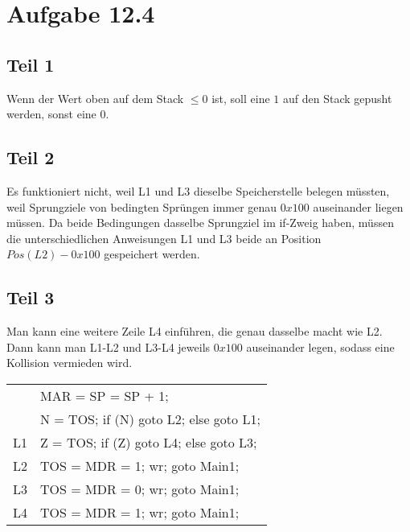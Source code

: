 \documentclass[10pt,a4paper]{article}
\begin{document}
\section*{Aufgabe 12.4}

\subsection*{Teil 1}

Wenn der Wert oben auf dem Stack $\le 0$ ist, soll eine $1$ auf den Stack gepusht werden, sonst eine $0$.

\subsection*{Teil 2}

Es funktioniert nicht, weil L1 und L3 dieselbe Speicherstelle belegen müssten, weil Sprungziele von bedingten Sprüngen immer genau $0x100$ auseinander liegen müssen.
Da beide Bedingungen dasselbe Sprungziel im if-Zweig haben, müssen die unterschiedlichen Anweisungen L1 und L3 beide an Position $Pos(L2) - 0x100$ gespeichert werden.

\subsection*{Teil 3}

Man kann eine weitere Zeile L4 einführen, die genau dasselbe macht wie L2.
Dann kann man L1-L2 und L3-L4 jeweils $0x100$ auseinander legen, sodass eine Kollision vermieden wird.

\begin{tabular}{l|l}
 & MAR = SP = SP + 1;\\
 & N = TOS; if (N) goto L2; else goto L1;\\
L1 & Z = TOS; if (Z) goto L4; else goto L3;\\
L2 & TOS = MDR = 1; wr; goto Main1;\\
L3 & TOS = MDR = 0; wr; goto Main1;\\
L4 & TOS = MDR = 1; wr; goto Main1;
\end{tabular}
\end{document}

